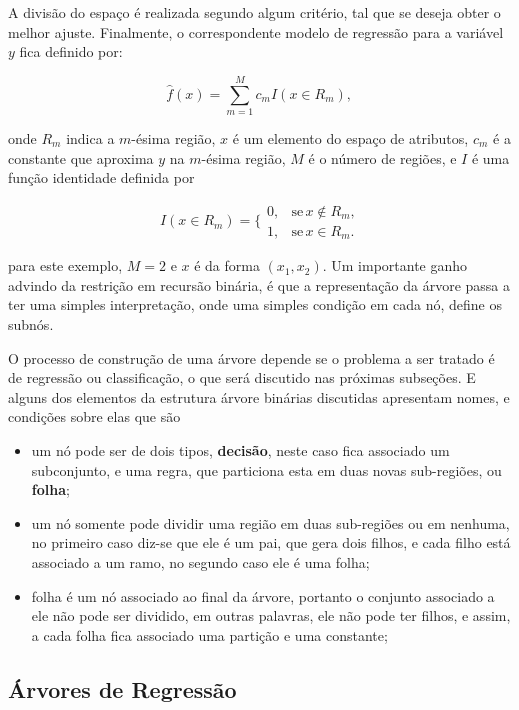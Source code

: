A divisão do espaço é realizada segundo algum critério, tal que se deseja obter o melhor ajuste. Finalmente, o correspondente modelo de regressão para a variável $y$ fica definido por:

\begin{equation}\label{eq:treeresponse}
\hat{f}(x)=\sum_{m=1}^Mc_mI(x\in{R_m})\mbox{,}~
\end{equation}

onde $R_m$ indica a $m$-ésima região, $x$ é um elemento do espaço de atributos, $c_m$ é a constante que aproxima $y$ na $m$-ésima região, $M$ é o número de regiões, e $I$ é uma função identidade definida por

\begin{equation}
I(x\in{R_m})=\Big\{\begin{array}{cc}
0,&\mbox{se}\, x\notin{R_m}\mbox{,}\\ 
1,&\mbox{se}\, x\in{R_m}\mbox{.}
\end{array}
\end{equation}

\noindent
para este exemplo, $M=2$ e $x$ é da forma $(x_1, x_2)$. Um importante ganho advindo da restrição em recursão binária, é que a representação da árvore passa a ter uma simples interpretação, onde uma simples condição em cada nó, define os subnós. 

O processo de construção de uma árvore depende se o problema a ser tratado é de regressão ou classificação, o que será discutido nas próximas subseções. E alguns dos elementos da estrutura árvore binárias discutidas apresentam nomes, e condições sobre elas que são

\begin{itemize}
\item um nó pode ser de dois tipos, {\bf decisão}, neste caso fica associado um subconjunto, e uma regra, que particiona esta em duas novas sub-regiões, ou {\bf folha};
\item um nó somente pode dividir uma região em duas sub-regiões ou em nenhuma, no primeiro caso diz-se que ele é um pai, que gera dois filhos, e cada filho está associado a um ramo, no segundo caso ele é uma folha;
\item folha é um nó associado ao final da árvore, portanto o conjunto associado a ele não pode ser dividido, em outras palavras, ele não pode ter filhos, e assim, a cada folha fica associado uma partição e uma constante;
\end{itemize}


\subsection{Árvores de Regressão}

